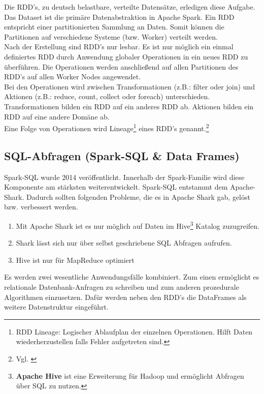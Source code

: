 \noindent
Die RDD's, zu deutsch belastbare, verteilte Datensätze, erledigen diese Aufgabe. Das Dataset ist die primäre Datenabstraktion in Apache Spark. 
Ein RDD entspricht einer partitionierten Sammlung an Daten. Somit können die Partitionen auf verschiedene Systeme (bzw. Worker) verteilt werden.  \\
Nach der Erstellung sind RDD's nur lesbar. Es ist nur möglich ein einmal definiertes RDD durch Anwendung globaler Operationen in ein neues RDD zu überführen. Die Operationen werden anschließend auf allen Partitionen des RDD's auf allen Worker Nodes angewendet. \\
\noindent
Bei den Operationen wird zwischen Transformationen (z.B.: filter oder join) und Aktionen (z.B.: reduce, count, collect oder foreach) unterschieden. Transformationen bilden ein RDD auf ein anderes RDD ab. Aktionen bilden ein RDD auf eine andere Domäne ab.\\ %
\noindent
Eine Folge von Operationen wird Lineage\footnote{RDD Lineage: Logischer Ablaufplan der einzelnen Operationen. Hilft Daten wiederherzustellen falls Fehler aufgetreten sind.} eines RDD's genannt.\footnote{Vgl. \cite{ZC+12}}



\newpage
\subsection{SQL-Abfragen (Spark-SQL \& Data Frames)}\label{sec_sparksql}

Spark-SQL wurde 2014 veröffentlicht. Innerhalb der Spark-Familie wird diese Komponente am stärksten weiterentwickelt. Spark-SQL entstammt dem Apache-Shark. Dadurch sollten folgenden Probleme, die es in Apache Shark gab, gelöst bzw. verbessert werden.
\begin{enumerate}
	\item Mit Apache Shark ist es nur möglich auf Daten im Hive\footnote{\textbf{Apache Hive} ist eine Erweiterung für Hadoop und ermöglicht Abfragen über SQL zu nutzen.} Katalog zuzugreifen. 
	\item Shark lässt sich nur über selbst geschriebene SQL Abfragen aufrufen. 
	\item Hive ist nur für MapReduce optimiert
\end{enumerate}

\noindent
Es werden zwei wesentliche Anwendungsfälle kombiniert. Zum einen ermöglicht es relationale Datenbank-Anfragen zu schreiben und zum anderen prozedurale Algorithmen einzusetzen. 
Dafür werden neben den RDD's die DataFrames als weitere Datenstruktur eingeführt.\\

